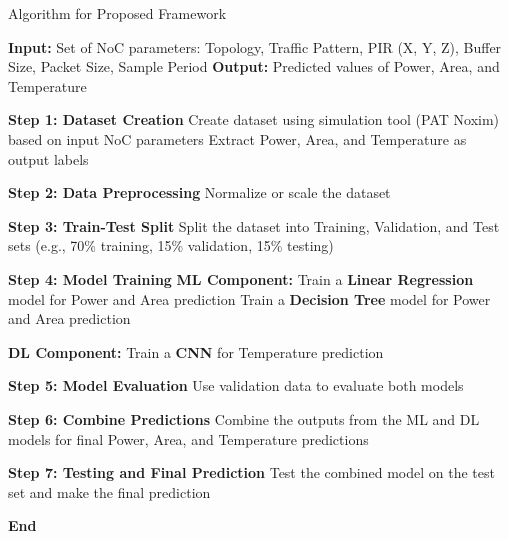\documentclass[conference]{IEEEtran}
\begin{document}
\begin{algorithm}
\caption{Algorithm for Proposed Framework}\label{alg:pat_prediction}
\begin{algorithmic}[1]
    \State \textbf{Input:} Set of NoC parameters: Topology, Traffic Pattern, PIR (X, Y, Z), Buffer Size, Packet Size, Sample Period
    \State \textbf{Output:} Predicted values of Power, Area, and Temperature
    
    \State \textbf{Step 1: Dataset Creation}
    \State Create dataset using simulation tool (PAT Noxim) based on input NoC parameters
    \State Extract Power, Area, and Temperature as output labels
    
    \State \textbf{Step 2: Data Preprocessing}
    \State Normalize or scale the dataset
    
    \State \textbf{Step 3: Train-Test Split}
    \State Split the dataset into Training, Validation, and Test sets (e.g., 70\% training, 15\% validation, 15\% testing)
    
    \State \textbf{Step 4: Model Training}
    \State \textbf{ML Component:}
    \State Train a \textbf{Linear Regression} model for Power and Area prediction
    \State Train a \textbf{Decision Tree} model for Power and Area prediction
    
    \State \textbf{DL Component:}
    \State Train a \textbf{CNN} for Temperature prediction
    
    \State \textbf{Step 5: Model Evaluation}
    \State Use validation data to evaluate both models
    
    \State \textbf{Step 6: Combine Predictions}
    \State Combine the outputs from the ML and DL models for final Power, Area, and Temperature predictions
    
    \State \textbf{Step 7: Testing and Final Prediction}
    \State Test the combined model on the test set and make the final prediction
    
    \State \textbf{End}
\end{algorithmic}
\end{algorithm}
\end{document}
